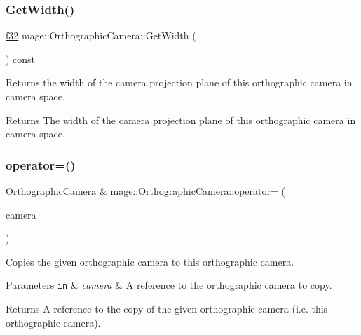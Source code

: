 \subsubsection{\texorpdfstring{Get\+Width()}{GetWidth()}}
{\footnotesize\ttfamily \hyperlink{namespacemage_a6a44ad388483959dc4dff9f2aef91431}{f32} mage\+::\+Orthographic\+Camera\+::\+Get\+Width (\begin{DoxyParamCaption}{ }\end{DoxyParamCaption}) const\hspace{0.3cm}{\ttfamily [noexcept]}}

Returns the width of the camera projection plane of this orthographic camera in camera space.

\begin{DoxyReturn}{Returns}
The width of the camera projection plane of this orthographic camera in camera space. 
\end{DoxyReturn}
\hypertarget{classmage_1_1_orthographic_camera_ac4a319517ed3b9708028e555660b23aa}{}\label{classmage_1_1_orthographic_camera_ac4a319517ed3b9708028e555660b23aa} 
\subsubsection{\texorpdfstring{operator=()}{operator=()}\hspace{0.1cm}{\footnotesize\ttfamily [1/2]}}
{\footnotesize\ttfamily \hyperlink{classmage_1_1_orthographic_camera}{Orthographic\+Camera} \& mage\+::\+Orthographic\+Camera\+::operator= (\begin{DoxyParamCaption}\item[{const \hyperlink{classmage_1_1_orthographic_camera}{Orthographic\+Camera} \&}]{camera }\end{DoxyParamCaption})\hspace{0.3cm}{\ttfamily [default]}}

Copies the given orthographic camera to this orthographic camera.


\begin{DoxyParams}[1]{Parameters}
\mbox{\tt in}  & {\em camera} & A reference to the orthographic camera to copy. \\
\hline
\end{DoxyParams}
\begin{DoxyReturn}{Returns}
A reference to the copy of the given orthographic camera (i.\+e. this orthographic camera). 
\end{DoxyReturn}
\hypertarget{classmage_1_1_orthographic_camera_a7fc303921e07ae18dd6fb7e9b7812847}{}\label{classmage_1_1_orthographic_camera_a7fc303921e07ae18dd6fb7e9b7812847} 

